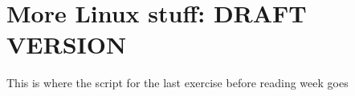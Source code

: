 \chapter{More Linux stuff: DRAFT VERSION}


\begin{note}
  This is where the script for the last exercise before reading week goes

\end{note}

